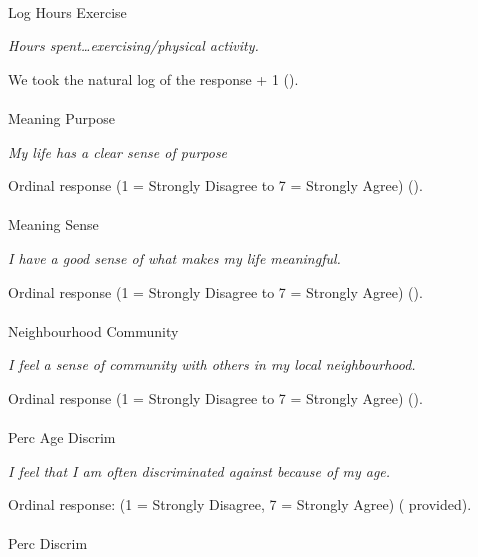 \documentclass[
  single column]{article}
\makeatletter
\let\oldparagraph\paragraph
\renewcommand{\paragraph}{
    \@ifstar
      \xxxParagraphStar
      \xxxParagraphNoStar
  }
\newcommand{\xxxParagraphStar}[1]{\oldparagraph*{#1}\mbox{}}
\newcommand{\xxxParagraphNoStar}[1]{\oldparagraph{#1}\mbox{}}
\makeatother
\begin{document}
\paragraph{Log Hours Exercise}\label{log-hours-exercise}

\emph{Hours spent\ldots exercising/physical activity.}

We took the natural log of the response + 1
().

\paragraph{Meaning Purpose}\label{meaning-purpose}

\emph{My life has a clear sense of purpose}

Ordinal response (1 = Strongly Disagree to 7 = Strongly Agree)
().

\paragraph{Meaning Sense}\label{meaning-sense}

\emph{I have a good sense of what makes my life meaningful.}

Ordinal response (1 = Strongly Disagree to 7 = Strongly Agree)
().

\paragraph{Neighbourhood Community}\label{neighbourhood-community}

\emph{I feel a sense of community with others in my local
neighbourhood.}

Ordinal response (1 = Strongly Disagree to 7 = Strongly Agree)
().

\paragraph{Perc Age Discrim}\label{perc-age-discrim}

\emph{I feel that I am often discriminated against because of my age.}

Ordinal response: (1 = Strongly Disagree, 7 = Strongly Agree)
( provided).

\paragraph{Perc Discrim}\label{perc-discrim}
\end{document}
